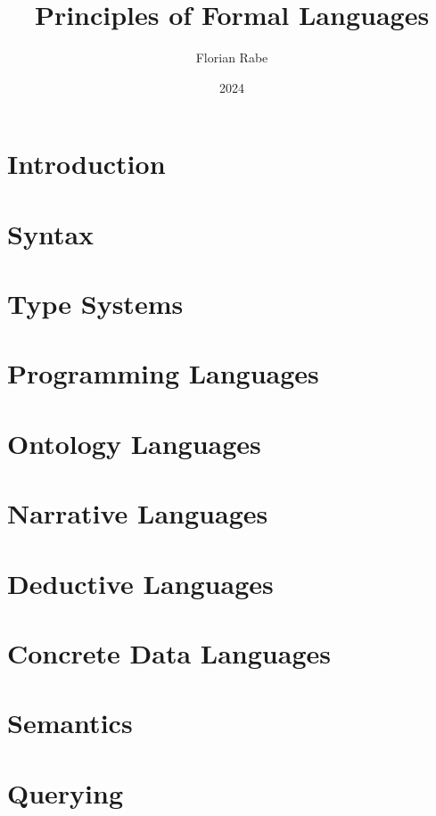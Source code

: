 \documentclass{beamer}
\begin{document}
\title{Principles of Formal Languages}
\author{Florian Rabe}
\date{2024}
\begin{frame}
    \titlepage
\end{frame}

\part{Introduction}


\part{Syntax}


\part{Type Systems}


\part{Programming Languages}


\part{Ontology Languages}


\part{Narrative Languages}


\part{Deductive Languages}


\part{Concrete Data Languages}


\part{Semantics}


\part{Querying}

\end{document}
